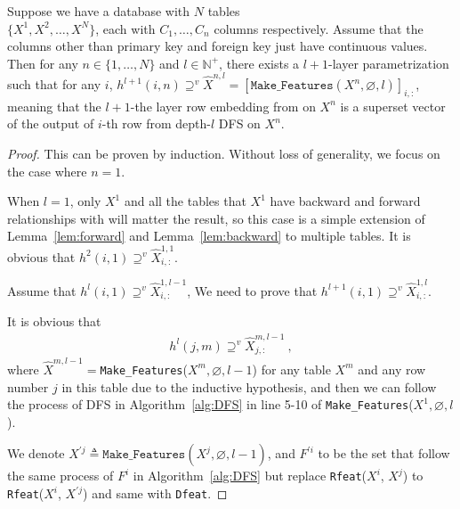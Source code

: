 \begin{theorem}
    Suppose we have a database with $N$ tables \\$\{X^1, X^2, \ldots, X^N\}$, each with $C_1, \ldots, C_n$ columns respectively. Assume that the columns other than primary key and foreign key just have continuous values.  Then for any $n \in\{1, \ldots, N\}$ 
    and $l \in \mathbb{N}^+$, there exists a $l+1$-layer \model{} parametrization such that for any $i$, $h^{l+1}(i, n) \supseteq^v \hat{X}^{n,l}=[\texttt{Make\_Features}(X^n, \varnothing, l)]_{i,:}$, meaning that the $l+1$-the layer row embedding from \model{} on $X^n$ is a superset vector of the output of $i$-th row from depth-$l$ DFS on $X^n$.
\end{theorem}

\begin{proof}
    This can be proven by induction. Without loss of generality, we focus on the case where $n=1$.
    
     When $l=1$, only $X^1$ and all the tables that $X^1$ have backward and forward relationships with will matter the result, so this case is a simple extension of Lemma~\ref{lem:forward} and Lemma~\ref{lem:backward} to multiple tables. It is obvious that $h^2(i, 1)\supseteq^v \hat{X}^{1,1}_{i,:}$.
     
     Assume that $h^l(i, 1)\supseteq^v \hat{X}^{1,l-1}_{i,:}$, We need to prove that $h^{l+1}(i, 1)\supseteq^v\hat{X}^{1,l}_{i,:}$.
     
    It is obvious that \begin{align}\label{eq:th4tmp}
        h^l(j, m)\supseteq^v \hat{X}^{m,l-1}_{j,:}~,
    \end{align}
    where $\hat{X}^{m,l-1}=$\texttt{Make\_Features}($X^m, \varnothing, l-1$) for any table $X^m$ and any row number $j$ in this table due to the inductive hypothesis, and then we can follow the process of DFS in Algorithm~\ref{alg:DFS} in line 5-10 of \texttt{Make\_Features}($X^1, \varnothing, l$).

    We denote $X^{'j}\triangleq\texttt{Make\_Features}(X^j,\varnothing, l-1)$, and $F^{'i}$ to be the set that follow the same process of $F^{i}$ in Algorithm~\ref{alg:DFS} but replace \texttt{Rfeat}($X^i$, $X^j$) to \texttt{Rfeat}($X^i$, $X^{'j}$) and same with \texttt{Dfeat}.
    

\end{proof}
